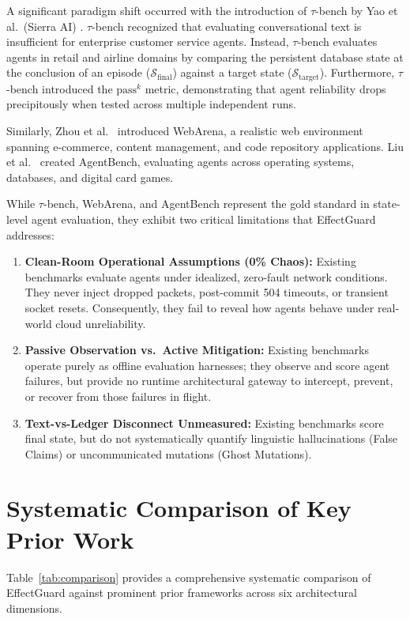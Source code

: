 A significant paradigm shift occurred with the introduction of $\tau$-bench by Yao et al.\ (Sierra AI) \cite{yao2024taubench}. $\tau$-bench recognized that evaluating conversational text is insufficient for enterprise customer service agents. Instead, $\tau$-bench evaluates agents in retail and airline domains by comparing the persistent database state at the conclusion of an episode ($\mathcal{S}_{\text{final}}$) against a target state ($\mathcal{S}_{\text{target}}$). Furthermore, $\tau$-bench introduced the $\text{pass}^k$ metric, demonstrating that agent reliability drops precipitously when tested across multiple independent runs.

Similarly, Zhou et al.\ \cite{zhou2023webarena} introduced WebArena, a realistic web environment spanning e-commerce, content management, and code repository applications. Liu et al.\ \cite{liu2023agentbench} created AgentBench, evaluating agents across operating systems, databases, and digital card games.

While $\tau$-bench, WebArena, and AgentBench represent the gold standard in state-level agent evaluation, they exhibit two critical limitations that EffectGuard addresses:
\begin{enumerate}
    \item \textbf{Clean-Room Operational Assumptions (0\% Chaos):} Existing benchmarks evaluate agents under idealized, zero-fault network conditions. They never inject dropped packets, post-commit 504 timeouts, or transient socket resets. Consequently, they fail to reveal how agents behave under real-world cloud unreliability.
    \item \textbf{Passive Observation vs.\ Active Mitigation:} Existing benchmarks operate purely as offline evaluation harnesses; they observe and score agent failures, but provide no runtime architectural gateway to intercept, prevent, or recover from those failures in flight.
    \item \textbf{Text-vs-Ledger Disconnect Unmeasured:} Existing benchmarks score final state, but do not systematically quantify linguistic hallucinations (False Claims) or uncommunicated mutations (Ghost Mutations).
\end{enumerate}

\section{Systematic Comparison of Key Prior Work}

Table~\ref{tab:comparison} provides a comprehensive systematic comparison of EffectGuard against prominent prior frameworks across six architectural dimensions.

